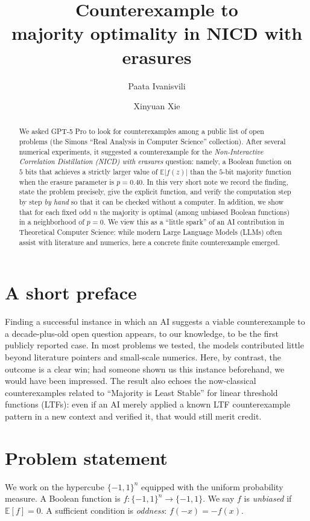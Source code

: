 \documentclass[11pt]{article}
\title{\bf  Counterexample to\\
majority optimality in NICD with erasures}
\author[1]{Paata Ivanisvili}
\author[1]{Xinyuan Xie}
\affil[1]{Department of Mathematics, University of California, Irvine, CA 92697, USA\\\texttt{\{pivanisv,xinyuax7\}@uci.edu}}
\date{}
\begin{document}
\maketitle

\begin{abstract}
We asked GPT-5 Pro to look for counterexamples among a public list of open problems (the Simons ``Real Analysis in Computer Science'' collection). After several numerical experiments, it suggested a counterexample for the \emph{Non-Interactive Correlation Distillation (NICD) with erasures} question: namely, a Boolean function on \(5\) bits that achieves a strictly larger value of \(\mathbb{E}|f(z)|\) than the \(5\)-bit majority function when the erasure parameter is \(p=0.40\).
In this very short note we record the finding, state the problem precisely, give the explicit function, and verify the computation step by step \emph{by hand} so that it can be checked without a computer. In addition, we show that for each fixed odd \(n\) the majority is optimal (among unbiased Boolean functions) in a neighborhood of \(p=0\).
We view this as a ``little spark'' of an AI contribution in Theoretical Computer Science: while modern Large Language Models (LLMs) often assist with literature and numerics, here a concrete finite counterexample emerged.
\end{abstract}

\section*{A short preface}
Finding a successful instance in which an AI suggests a viable counterexample to a decade-plus-old open question appears, to our knowledge, to be the first publicly reported case. In most problems we tested, the models contributed little beyond literature pointers and small-scale numerics. Here, by contrast, the outcome is a clear win; had someone shown us this instance beforehand, we would have been impressed. The result also echoes the now-classical counterexamples \cite{Jain2017,Biswas23} related to ``Majority is Least Stable'' for linear threshold functions (LTFs): even if an AI merely applied a known LTF counterexample pattern in a new context and verified it, that would still merit credit.

\section{Problem statement}
We work on the hypercube \(\{-1,1\}^n\) equipped with the uniform probability measure. A Boolean function is \(f:\{-1,1\}^n\to\{-1,1\}\). We say \(f\) is \emph{unbiased} if \(\mathbb{E}[f]=0\). A sufficient condition is \emph{oddness}: \(f(-x)=-f(x)\).
\end{document}
